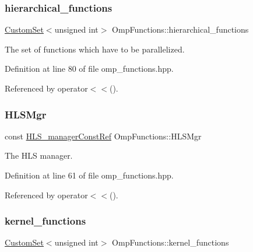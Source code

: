 \mbox{\label{classOmpFunctions_a38dce0236327c67af64c891d9c10a577}} 
\subsubsection{\texorpdfstring{hierarchical\+\_\+functions}{hierarchical\_functions}}
{\footnotesize\ttfamily \hyperlink{custom__set_8hpp_a615bc2f42fc38a4bb1790d12c759e86f}{Custom\+Set}$<$unsigned int$>$ Omp\+Functions\+::hierarchical\+\_\+functions}



The set of functions which have to be parallelized. 



Definition at line 80 of file omp\+\_\+functions.\+hpp.



Referenced by operator$<$$<$().

\mbox{\label{classOmpFunctions_ac4f7ea9ae8c6f4ba3858cdf2cc7ed986}} 
\subsubsection{\texorpdfstring{H\+L\+S\+Mgr}{HLSMgr}}
{\footnotesize\ttfamily const \hyperlink{hls__manager_8hpp_a1b481383e3beabc89bd7562ae672dd8c}{H\+L\+S\+\_\+manager\+Const\+Ref} Omp\+Functions\+::\+H\+L\+S\+Mgr\hspace{0.3cm}{\ttfamily [protected]}}



The H\+LS manager. 



Definition at line 61 of file omp\+\_\+functions.\+hpp.



Referenced by operator$<$$<$().

\mbox{\label{classOmpFunctions_a2ed2c022afbba84efd566b61849b1e16}} 
\subsubsection{\texorpdfstring{kernel\+\_\+functions}{kernel\_functions}}
{\footnotesize\ttfamily \hyperlink{custom__set_8hpp_a615bc2f42fc38a4bb1790d12c759e86f}{Custom\+Set}$<$unsigned int$>$ Omp\+Functions\+::kernel\+\_\+functions}



